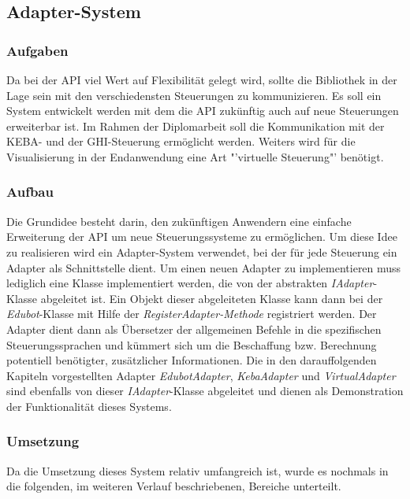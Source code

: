 
\subsection{Adapter-System}

\subsubsection{Aufgaben}
Da bei der API viel Wert auf Flexibilität gelegt wird, sollte die Bibliothek in der Lage sein mit den verschiedensten Steuerungen zu kommunizieren. Es soll ein System entwickelt werden mit dem die API zukünftig auch auf neue Steuerungen erweiterbar ist. Im Rahmen der Diplomarbeit soll die Kommunikation mit der KEBA- und der GHI-Steuerung ermöglicht werden. Weiters wird für die Visualisierung in der Endanwendung eine Art "'virtuelle Steuerung"' benötigt.

\subsubsection{Aufbau}
Die Grundidee besteht darin, den zukünftigen Anwendern eine einfache Erweiterung der API um neue Steuerungssysteme zu ermöglichen. Um diese Idee zu realisieren wird ein Adapter-System verwendet, bei der für jede Steuerung ein Adapter als Schnittstelle dient. Um einen neuen Adapter zu implementieren muss lediglich eine Klasse implementiert werden, die von der abstrakten \textit{IAdapter}-Klasse abgeleitet ist. Ein Objekt dieser abgeleiteten Klasse kann dann bei der \textit{Edubot}-Klasse mit Hilfe der \textit{RegisterAdapter-Methode} registriert werden. Der Adapter dient dann als Übersetzer der allgemeinen Befehle in die spezifischen Steuerungssprachen und kümmert sich um die Beschaffung bzw. Berechnung potentiell benötigter, zusätzlicher Informationen. Die in den darauffolgenden Kapiteln vorgestellten Adapter  \textit{EdubotAdapter}, \textit{KebaAdapter} und \textit{VirtualAdapter} sind ebenfalls von dieser \textit{IAdapter}-Klasse abgeleitet und dienen als Demonstration der Funktionalität dieses Systems. 

\subsubsection{Umsetzung}

Da die Umsetzung dieses System relativ umfangreich ist, wurde es nochmals in die folgenden, im weiteren Verlauf beschriebenen, Bereiche unterteilt.\\


